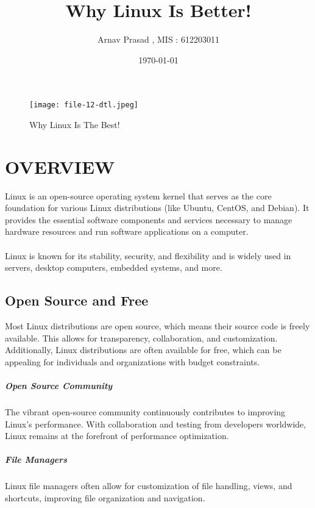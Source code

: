 \documentclass{article}
\begin{document}
\title{Why Linux Is Better!}
\author{Arnav Prasad , MIS : 612203011}
\date{\today}
\maketitle

\newpage
{}
\tableofcontents
\newpage


\newpage

\begin{figure}
\texttt{[image: file-12-dtl.jpeg]}
\caption{Why Linux Is The Best!}
\label{fig:Why Linux is the best}
\end{figure}


\section{OVERVIEW}

Linux is an open-source operating system kernel that serves as the core foundation for various Linux distributions (like Ubuntu, CentOS, and Debian). It provides the essential software components and services necessary to manage hardware resources and run software applications on a computer. 
\paragraph{}
Linux is known for its stability, security, and flexibility and is widely used in servers, desktop computers, embedded systems, and more.

\subsection{Open Source and Free}
 Most Linux distributions are open source, which means their source code is freely available. This allows for transparency, collaboration, and customization. Additionally, Linux distributions are often available for free, which can be appealing for individuals and organizations with budget constraints.

\subparagraph{Open Source Community}
The vibrant open-source community continuously contributes to improving Linux's performance. With collaboration and testing from developers worldwide, Linux remains at the forefront of performance optimization.

\subparagraph{File Managers}
Linux file managers often allow for customization of file handling, views, and shortcuts, improving file organization and navigation.
\end{document}
